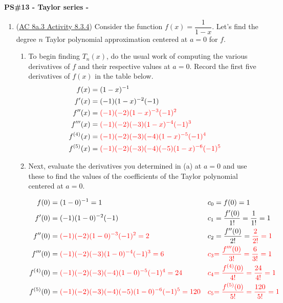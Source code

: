 \documentclass[10pt]{article}
\renewcommand{\section}[1]{\begin{center} \textbf{#1} \\\end{center}}
\begin{document}
%


\allowdisplaybreaks
\section{PS\#13 - Taylor series -  }

\everymath{\displaystyle}
\begin{enumerate}[leftmargin=0pt]

\item (\href{https://faculty.gvsu.edu/boelkinm/Home/ACS/sec-8a-3-geometric.html#act-8a-3-3}{AC 8a.3 Activity 8.3.4}) Consider the function $f(x) = \dfrac{1}{1-x}$. Let's find the degree $n$ Taylor polynomial approximation centered at $a=0$ for $f$.
\begin{enumerate}
    \item To begin finding $T_n(x)$, do the usual work of computing the various derivatives of $f$ and their respective values at $a = 0$. Record the first five derivatives of $f(x)$ in the table below.
    \begin{align*}
        f(x) &= (1-x)^{-1} \\
        f'(x) &= (-1)(1-x)^{-2}(-1) \\
        f''(x) &= {\color{red} (-1)(-2)(1-x)^{-3}(-1)^2} \\
        f'''(x) &= {\color{red} (-1)(-2)(-3)(1-x)^{-4}(-1)^3} \\
        f^{(4)}(x) &= {\color{red} (-1)(-2)(-3)(-4)(1-x)^{-5}(-1)^4} \\
        f^{(5)}(x) &= {\color{red} (-1)(-2)(-3)(-4)(-5)(1-x)^{-6}(-1)^5}
    \end{align*}

    \item Next, evaluate the derivatives you determined in (a) at $a=0$ and use these to find the values of the coefficients of the Taylor polynomial centered at $a=0$.

    \begin{align*}
        f(0) &= (1-0)^{-1} = 1 & c_0 &= f(0) = 1 \\
        f'(0) &= (-1)(1-0)^{-2}(-1) & c_1 &= \dfrac{f'(0)}{1!} = \dfrac{1}{1!} = 1 \\
        f''(0) &= {\color{red} (-1)(-2)(1-0)^{-3}(-1)^2 = 2} 
        & c_2 &= \dfrac{f''(0)}{2!} = {\color{red} \dfrac{2}{2!} = 1}\\
        f'''(0) &= {\color{red} (-1)(-2)(-3)(1-0)^{-4}(-1)^3 = 6} 
        & {\color{red} c_3} &{\color{red} = \dfrac{f'''(0)}{3!} =  \dfrac{6}{3!} = 1}\\
        f^{(4)}(0) &= {\color{red} (-1)(-2)(-3)(-4)(1-0)^{-5}(-1)^4 = 24} 
        & {\color{red} c_4} &{\color{red} = \dfrac{f^{(4)}(0)}{4!} =  \dfrac{24}{4!} = 1}\\
        f^{(5)}(0) &= {\color{red} (-1)(-2)(-3)(-4)(-5)(1-0)^{-6}(-1)^5 = 120 }
        & {\color{red} c_5} &{\color{red} = \dfrac{f^{(5)}(0)}{5!} =  \dfrac{120}{5!} = 1}
    \end{align*}
    

\end{enumerate}
\end{enumerate}
\end{document}
